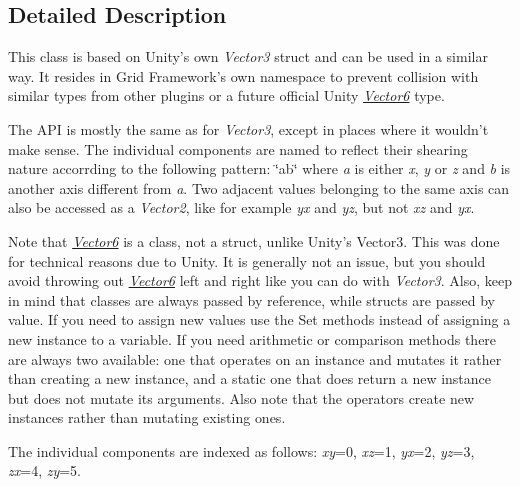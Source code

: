 \subsection{Detailed Description}
This class is based on Unity's own {\itshape Vector3} struct and can be used in a similar way. It resides in Grid Framework's own namespace to prevent collision with similar types from other plugins or a future official Unity {\itshape \hyperlink{class_grid_framework_1_1_vectors_1_1_vector6}{Vector6}} type.

The A\+P\+I is mostly the same as for {\itshape Vector3}, except in places where it wouldn't make sense. The individual components are named to reflect their shearing nature accorrding to the following pattern\+: \char`\"{}ab\char`\"{} where {\itshape a} is either {\itshape x}, {\itshape y} or {\itshape z} and {\itshape b} is another axis different from {\itshape a}. Two adjacent values belonging to the same axis can also be accessed as a {\itshape Vector2}, like for example {\itshape yx} and {\itshape yz}, but not {\itshape xz} and {\itshape yx}.

Note that {\itshape \hyperlink{class_grid_framework_1_1_vectors_1_1_vector6}{Vector6}} is a class, not a struct, unlike Unity's Vector3. This was done for technical reasons due to Unity. It is generally not an issue, but you should avoid throwing out {\itshape \hyperlink{class_grid_framework_1_1_vectors_1_1_vector6}{Vector6}} left and right like you can do with {\itshape Vector3}. Also, keep in mind that classes are always passed by reference, while structs are passed by value. If you need to assign new values use the {\ttfamily Set} methods instead of assigning a new instance to a variable. If you need arithmetic or comparison methods there are always two available\+: one that operates on an instance and mutates it rather than creating a new instance, and a static one that does return a new instance but does not mutate its arguments. Also note that the operators create new instances rather than mutating existing ones.

The individual components are indexed as follows\+: {\itshape xy}=0, {\itshape xz}=1, {\itshape yx}=2, {\itshape yz}=3, {\itshape zx}=4, {\itshape zy}=5. 

